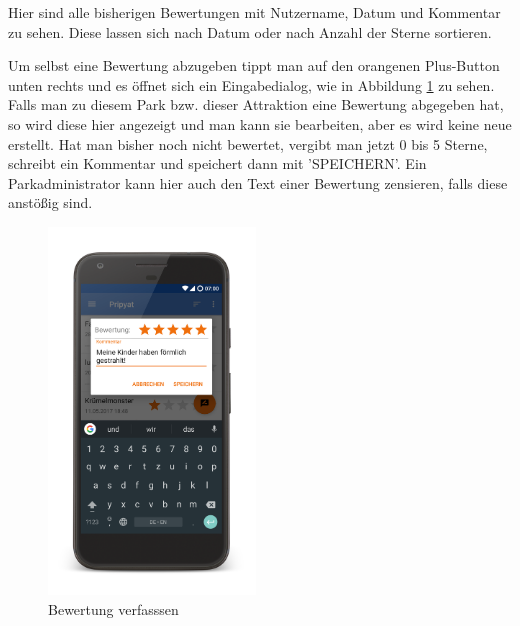 Hier sind alle bisherigen Bewertungen mit Nutzername, Datum und Kommentar zu sehen. Diese lassen sich nach Datum oder nach Anzahl der Sterne sortieren.

Um selbst eine Bewertung abzugeben tippt man auf den orangenen Plus-Button unten rechts und es öffnet sich ein Eingabedialog, wie in Abbildung \ref{figure:implementierungbewerten} zu sehen. Falls man zu diesem Park bzw. dieser Attraktion eine Bewertung abgegeben hat, so wird diese hier angezeigt und man kann sie bearbeiten, aber es wird keine neue erstellt. Hat man bisher noch nicht bewertet, vergibt man jetzt 0 bis 5 Sterne, schreibt ein Kommentar und speichert dann mit 'SPEICHERN'. Ein Parkadministrator kann hier auch den Text einer Bewertung zensieren, falls diese anstößig sind.

\begin{figure}[h]
    \centering
    \begin{minipage}{0.49\textwidth}
        \centering
        \includegraphics[width=0.49\textwidth, trim=150 200 200 200, 
        clip]{img/screenshots/ss_bewertung_edit.png}
        \caption{Bewertung verfasssen}
		\label{figure:implementierungbewerten}
    \end{minipage}
    \begin{minipage}{0.49\textwidth}
        \centering

\end{minipage}
\end{figure}
